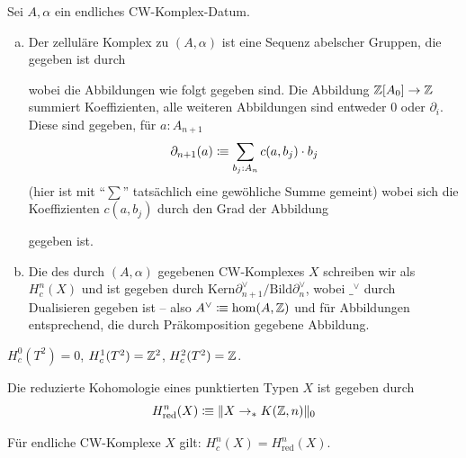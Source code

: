 \begin{definition}
  Sei \(A,\alpha\) ein endliches CW-Komplex-Datum.
  \begin{enumerate}[(a)]
  \item Der zelluläre Komplex zu \((A,\alpha)\) ist eine Sequenz abelscher Gruppen, die gegeben ist durch
    \begin{center}
    \end{center}
    wobei die Abbildungen wie folgt gegeben sind.
    Die Abbildung \(\mathbb{Z}[A_0]\to \mathbb{Z}\) summiert Koeffizienten, alle weiteren Abbildungen sind entweder \(0\) oder  \(\partial_i\).
    Diese sind gegeben, für \(a:A_{n+1}\) 
    \[
      \partial_{n+1}(a)\vcentcolon\mspace{-1.2mu}\equiv \sum_{b_j:A_{n}}c(a,b_j)\cdot b_j
      \]
      (hier ist mit ``\(\sum\)'' tatsächlich eine gewöhliche Summe gemeint)
      wobei sich die Koeffizienten \(c(a,b_j)\) durch den Grad der Abbildung
      \begin{center}
      \end{center}
      gegeben ist.
    \item Die  des durch \((A,\alpha)\) gegebenen CW-Komplexes \(X\) schreiben wir als \(H^n_c(X)\) und ist gegeben durch \(\mathrm{Kern}\partial_{n+1}^\vee/\mathrm{Bild}\partial_n^\vee\), wobei \(\_^\vee\) durch Dualisieren gegeben ist -- also \(A^\vee\vcentcolon\mspace{-1.2mu}\equiv \mathrm{hom}(A,\mathbb{Z})\) und für Abbildungen entsprechend, die durch Präkomposition gegebene Abbildung.
  \end{enumerate}
\end{definition}

\begin{beispiel}
  \(H^0_c(T^2)=0\), \(H^1_c(T^2)=\mathbb{Z}^2\), \(H^2_c(T^2)=\mathbb{Z}\).
\end{beispiel}

\begin{definition}
  Die reduzierte Kohomologie eines punktierten Typen \(X\) ist gegeben durch
  \[
    H^n_{\mathrm{red}}(X)\vcentcolon\mspace{-1.2mu}\equiv \|X\to_\ast K(\mathbb{Z},n)\|_0
  \]
\end{definition}

\begin{fakt}
  Für endliche CW-Komplexe \(X\) gilt: \(H^n_c(X)=H^n_{\mathrm{red}}(X)\).
\end{fakt}
